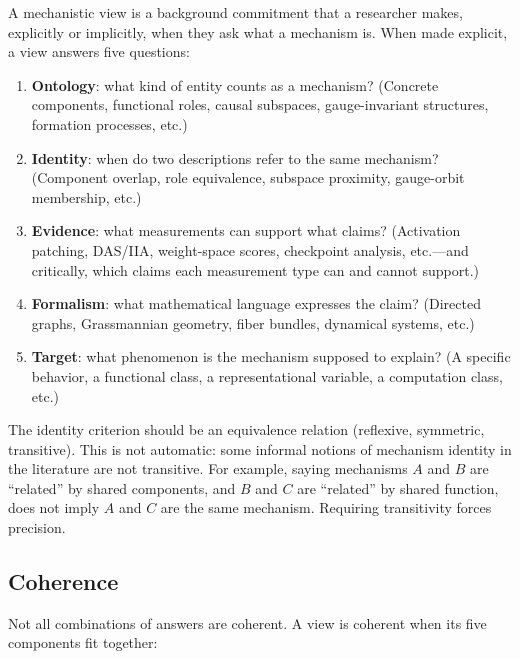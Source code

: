 \documentclass{article}
\begin{document}
A mechanistic view is a background commitment that a researcher makes,
explicitly or implicitly, when they ask what a mechanism is.  When made
explicit, a view answers five questions:

\begin{enumerate}[leftmargin=*, label=(\roman*)]
\item \textbf{Ontology}: what kind of entity counts as a mechanism?
      (Concrete components, functional roles, causal subspaces,
      gauge-invariant structures, formation processes, etc.)
\item \textbf{Identity}: when do two descriptions refer to the same
      mechanism?  (Component overlap, role equivalence, subspace
      proximity, gauge-orbit membership, etc.)
\item \textbf{Evidence}: what measurements can support what claims?
      (Activation patching, DAS/IIA, weight-space scores, checkpoint
      analysis, etc.---and critically, which claims each measurement
      type can and cannot support.)
\item \textbf{Formalism}: what mathematical language expresses the
      claim?  (Directed graphs, Grassmannian geometry, fiber bundles,
      dynamical systems, etc.)
\item \textbf{Target}: what phenomenon is the mechanism supposed to
      explain?  (A specific behavior, a functional class, a
      representational variable, a computation class, etc.)
\end{enumerate}

The identity criterion should be an equivalence relation (reflexive,
symmetric, transitive).  This is not automatic: some informal notions
of mechanism identity in the literature are not transitive.  For
example, saying mechanisms $A$ and $B$ are ``related'' by shared
components, and $B$ and $C$ are ``related'' by shared function, does
not imply $A$ and $C$ are the same mechanism.  Requiring transitivity
forces precision.

\subsection{Coherence}\label{sec:coherence}

Not all combinations of answers are coherent.  A view is coherent when
its five components fit together:
\end{document}
